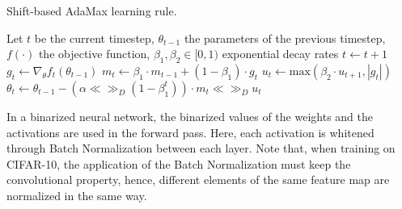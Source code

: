 \documentclass[a4paper]{article}
\numberwithin{equation}{section} %
\numberwithin{figure}{section} %
\numberwithin{table}{section} %
\theoremstyle{definition}
\begin{document}
\begin{algorithm}
	\caption{Shift-based AdaMax learning rule\cite{binarynet}.}
	\label{algorithm:shift-based-adamax}
	\begin{algorithmic}[1]
	\State Let $t$ be the current timestep, $\theta_{t-1}$
	    the parameters of the previous timestep, $f(\cdot)$ the objective function, $\beta_1,
	    \beta_2 \in [0, 1)$ exponential decay rates
	\State $t \gets t + 1$
	\State $g_t \gets \nabla_\theta f_t(\theta_{t-1})$
	\State $m_t \gets \beta_1 \cdot m_{t-1} + (1-\beta_1)
	    \cdot g_t$
	\State $u_t \gets \text{max}(\beta_2 \cdot u_{t+1},
	    |g_t|)$
	\State $\theta_t \gets \theta_{t-1} - (\alpha
	    \ll\gg_D(1-\beta_1^t)) \cdot m_t \ll\gg_D u_t$
	\end{algorithmic}
\end{algorithm}

In a binarized neural network, the binarized values of the weights
and the activations are used in the forward pass. Here, each activation
is whitened through Batch Normalization between each layer. Note that,
when training on CIFAR-10, the application of the Batch Normalization
must keep the convolutional property, hence, different elements of the same
feature map are normalized in the same way.



\end{document}
